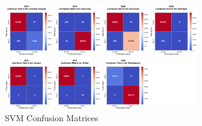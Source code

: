         \clearpage
    
        
        \begin{figure}[H]
        
            \centering
            
            \begin{minipage}{\textwidth}
                \centering
                \begin{minipage}[c]{\textwidth}
                    \centering
                    \includegraphics[width=0.75\textwidth]{../figures/plots/section2/SVM_confusion_matrices.png}
                    \caption{SVM Confusion Matrices}
                    \label{fig:svm_cm_base}
                \end{minipage}%
            \end{minipage}

            \vspace{0.5cm}  %
            

\end{figure}
